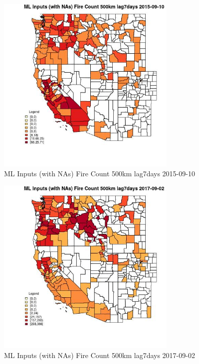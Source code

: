 \begin{figure} 
\centering  
\includegraphics[width=0.77\textwidth]{Code_Outputs/Report_ML_input_PM25_Step4_part_e_de_duplicated_aves_compiled_2019-05-21wNAs_CountyFire_Count_500km_lag7daysMean2015-09-10.jpg} 
\caption{\label{fig:Report_ML_input_PM25_Step4_part_e_de_duplicated_aves_compiled_2019-05-21wNAsCountyFire_Count_500km_lag7daysMean2015-09-10}ML Inputs (with NAs) Fire Count 500km lag7days 2015-09-10} 
\end{figure} 
 

\begin{figure} 
\centering  
\includegraphics[width=0.77\textwidth]{Code_Outputs/Report_ML_input_PM25_Step4_part_e_de_duplicated_aves_compiled_2019-05-21wNAs_CountyFire_Count_500km_lag7daysMean2017-09-02.jpg} 
\caption{\label{fig:Report_ML_input_PM25_Step4_part_e_de_duplicated_aves_compiled_2019-05-21wNAsCountyFire_Count_500km_lag7daysMean2017-09-02}ML Inputs (with NAs) Fire Count 500km lag7days 2017-09-02} 
\end{figure} 
 

